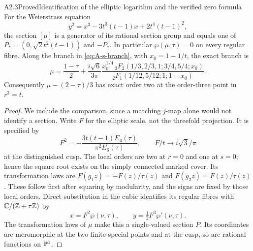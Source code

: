 \begin{claim}{A2.3}{Proved}{Identification of the elliptic logarithm and the verified zero formula}
For the Weierstrass equation
\[
y^2=x^3-3t^3(t-1)x+2t^4(t-1)^2,
\]
the section $[\mu]$ is a generator of its rational section group and
equals one of $P_*=(0,\sqrt2t^2(t-1))$ and $-P_*$.
In particular $\wp(\mu,\tau)=0$ on every regular fibre.
Along the branch in \eqref{eq:A-s-branch}, with
$x_0=1-1/t$, the exact branch is
\begin{equation}\label{eq:A-DI-branch}
\mu=\frac{1-\tau}{2}
 +\frac{i\sqrt6}{3\pi}
 \frac{x_0^{1/4}\,{}_3F_2(1/3,2/3,1;3/4,5/4;x_0)}
 {{}_2F_1(1/12,5/12;1;1-x_0)}.
\end{equation}
Consequently $\mu-(2-\tau)/3$ has exact order two at the
order-three point in $r^3=t$.
\end{claim}
\begin{proof}
We include the comparison, since a matching $j$-map alone would not
identify a section.  Write $F$ for the elliptic scale, not the
threefold projection.  It is specified by
\[
F^2=-\frac{3t(t-1)E_4(\tau)}{\pi^2E_6(\tau)},\qquad
F/t\longrightarrow i\sqrt3/\pi
\]
at the distinguished cusp.  The local orders are two at $r=0$ and
one at $s=0$; hence the square root exists on the simply connected
marked cover.  Its transformation laws are
$F(g_1z)=-F(z)/\tau(z)$ and $F(g_2z)=F(z)/\tau(z)$.
These follow first after squaring by modularity, and the signs are
fixed by those local orders.  Direct substitution in the cubic
identifies its regular fibres with $\mathbb C/(\mathbb Z+\tau\mathbb Z)$ by
\[
x=F^2\wp(\nu,\tau),\qquad y=\tfrac12F^3\wp'(\nu,\tau).
\]
The transformation laws of $\mu$ make this a single-valued section
$P$.  Its coordinates are meromorphic at the two finite special
points and at the cusp, so are rational functions on $\mathbb P^1$.


\end{proof}
